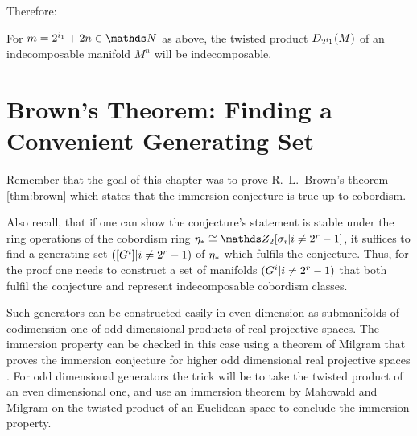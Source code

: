 Therefore:
\begin{Cor}\label{cor:twistedprod:indecompcriterion}
  For $m=2^{i_1}+2n\in\Nat$ as above, the twisted product
  $D_{2^{i_1}}({M})$ of an indecomposable manifold $M^n$ will be
  indecomposable.
\end{Cor}


\section
{Brown's Theorem: Finding a Convenient Generating Set}
\label{sec:proofbrown}
Remember that the goal of this chapter was to prove R.~L.~Brown's
theorem \ref{thm:brown} which states that the immersion conjecture is
true up to cobordism.

Also recall, that if one can show the conjecture's statement is stable
under the ring operations of the cobordism ring
$\c_*\cong\Zmod2[\sigma_i|i\neq2^r-1]$, it suffices to find a
generating set $([G^{i}]|i\neq2^r-1)$ of $\eta_*$ which fulfils the conjecture.
Thus, for the proof one needs to construct a set of manifolds
$(G^{i}|i\neq2^r-1)$ that both fulfil the conjecture and represent
indecomposable cobordism classes.

Such generators can be constructed easily in even dimension as
submanifolds of codimension one of odd-dimensional products of
real projective spaces. The immersion property can be checked in
this case using a theorem of Milgram that proves the immersion
conjecture for higher odd dimensional real projective spaces%
.
For odd dimensional generators the trick will be to take the twisted
product of an even dimensional one, and use an immersion theorem by
Mahowald and Milgram on the twisted product of an Euclidean space to
conclude the immersion property.

